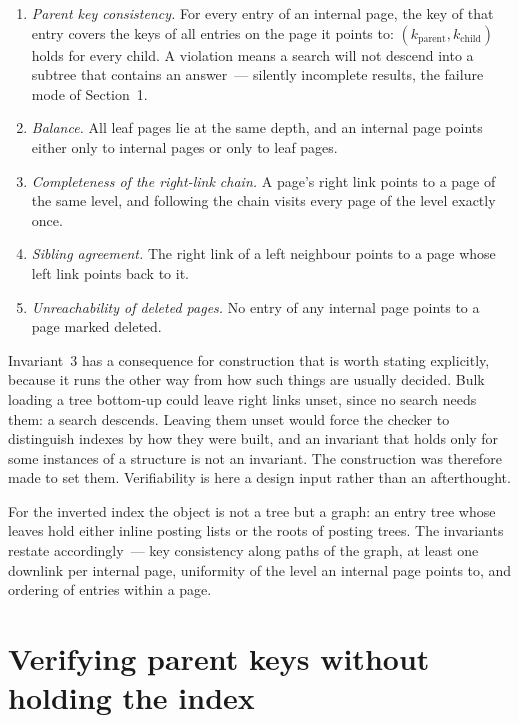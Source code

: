 \begin{enumerate}
\item \emph{Parent key consistency.} For every entry of an internal page, the
      key of that entry covers the keys of all entries on the page it points to:
      $(k_{\mathrm{parent}}, k_{\mathrm{child}})$ holds for
      every child. A violation means a search will not descend into a subtree
      that contains an answer~--- silently incomplete results, the failure mode
      of Section~1.
\item \emph{Balance.} All leaf pages lie at the same depth, and an internal page
      points either only to internal pages or only to leaf pages.
\item \emph{Completeness of the right-link chain.} A page's right link points to
      a page of the same level, and following the chain visits every page of the
      level exactly once.
\item \emph{Sibling agreement.} The right link of a left neighbour points to a
      page whose left link points back to it.
\item \emph{Unreachability of deleted pages.} No entry of any internal page
      points to a page marked deleted.
\end{enumerate}

Invariant~3 has a consequence for construction that is worth stating explicitly,
because it runs the other way from how such things are usually decided. Bulk
loading a tree bottom-up could leave right links unset, since no search needs
them: a search descends. Leaving them unset would force the checker to
distinguish indexes by how they were built, and an invariant that holds only for
some instances of a structure is not an invariant. The construction was therefore
made to set them. Verifiability is here a design input rather than an
afterthought.

For the inverted index the object is not a tree but a graph: an entry tree whose
leaves hold either inline posting lists or the roots of posting trees. The
invariants restate accordingly~--- key consistency along paths of the graph, at
least one downlink per internal page, uniformity of the level an internal page
points to, and ordering of entries within a page.

\section{Verifying parent keys without holding the index}
\label{sec:parent}

